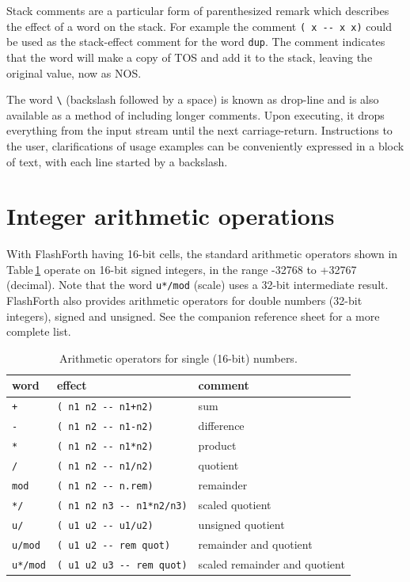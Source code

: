 \documentclass[12pt,a4paper]{article}
\begin{document}
\medskip
Stack comments are a particular form of parenthesized remark which describes
the effect of a word on the stack.
For example the comment \verb!( x -- x x)! could be used as the stack-effect comment 
for the word \verb!dup!.
The comment indicates that the word will make a copy of TOS and add it to the stack,
leaving the original value, now as NOS.

\medskip
The word \verb!\! (backslash followed by a space) is known as drop-line and is also
available as a method of including longer comments.
Upon executing, it drops everything from the input stream until the next carriage-return.
Instructions to the user, clarifications of usage examples can be conveniently expressed
in a block of text, with each line started by a backslash.


\bigskip
\section{Integer arithmetic operations}
\label{sec:arithmetic}
%
With FlashForth having 16-bit cells, the standard arithmetic operators 
shown in Table\,\ref{tab:arithmetic-operators}
operate on 16-bit signed integers, in the range -32768 to +32767 (decimal).
Note that the word \verb!u*/mod! (scale) uses a 32-bit intermediate result.
FlashForth also provides arithmetic operators 
for double numbers (32-bit integers), signed and unsigned.
See the companion reference sheet \cite{jacobs_2012c} for a more complete list.

\begin{table}[htb]
 \caption{Arithmetic operators for single (16-bit) numbers.}
 \label{tab:arithmetic-operators}
 \centering
 \begin{tabular}{lll}
  \hline
  word & effect & comment \\
  \hline
  \verb!+! & \verb!( n1 n2 -- n1+n2)! & sum \\
  \verb!-! & \verb!( n1 n2 -- n1-n2)! & difference \\
  \verb!*! & \verb!( n1 n2 -- n1*n2)! & product \\
  \verb!/! & \verb!( n1 n2 -- n1/n2)! & quotient \\
  \verb!mod! & \verb!( n1 n2 -- n.rem)! & remainder \\
  \verb!*/! & \verb!( n1 n2 n3 -- n1*n2/n3)! & scaled quotient \\
  \verb!u/! & \verb!( u1 u2 -- u1/u2)! & unsigned quotient \\
  \verb!u/mod! & \verb!( u1 u2 -- rem quot)! & remainder and quotient \\
  \verb!u*/mod! & \verb!( u1 u2 u3 -- rem quot)! & scaled remainder and quotient \\
  \hline
 \end{tabular}
\end{table}
\end{document}
